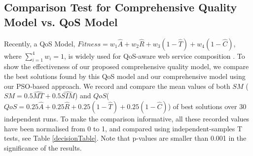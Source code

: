 \documentclass{llncs}
\begin{document}
\subsection{Comparison Test for Comprehensive Quality Model vs. QoS Model}\label{comparisonTest}

Recently, a QoS Model, $Fitness = w_1 \hat{A} + w_2 \hat{R} + w_3(1 - \hat{T}) + w_4(1 - \hat{C})$, where $\sum_{i=1}^{4} w_i = 1$, is widely used for QoS-aware web service composition \cite{ma2015hybrid,da2016particle,da2015graphevol}. To show the effectiveness of our proposed comprehensive quality model, we compare the best solutions found by this QoS model and our comprehensive model using our PSO-based approach. We record and compare the mean values of both $SM$ ($SM = 0.5 \hat{MT} + 0.5 \hat{SIM}$) and $QoS$($QoS = 0.25 \hat{A} + 0.25 \hat{R} + 0.25(1 - \hat{T}) + 0.25(1 - \hat{C})$) of best solutions over 30 independent runs. To make the comparison informative, all these recorded values have been normalised from 0 to 1, and compared using independent-samples T tests, see Table \ref{decisionTable}. Note that p-values are smaller than 0.001 in the significance of the results. 
\end{document}

